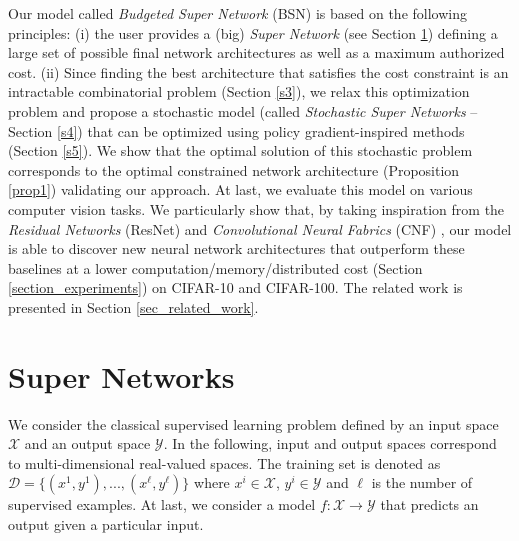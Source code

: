 \documentclass[10pt,twocolumn,letterpaper]{article}
\begin{document}
Our model called \textit{Budgeted Super Network} (BSN) is based on the following principles: (i) the user provides a (big) \textit{Super Network} (see Section \ref{secsn}) defining a large set of possible final network architectures as well as a maximum authorized cost. (ii) Since finding the best architecture that satisfies the cost constraint is an intractable combinatorial problem (Section \ref{s3}), we relax this optimization problem and propose a stochastic model (called \textit{Stochastic Super Networks} -- Section \ref{s4}) that can be optimized using policy gradient-inspired methods (Section \ref{s5}). We show that the optimal solution of this stochastic problem corresponds to the optimal constrained network architecture (Proposition \ref{prop1}) validating our approach. At last, we evaluate this model on various computer vision tasks. We particularly show that, by taking inspiration from the \textit{Residual Networks} (ResNet) \cite{DBLP:journals/corr/HeZRS15} and \textit{Convolutional Neural Fabrics} (CNF) \cite{DBLP:journals/corr/SaxenaV16}, our model is able to discover new neural network architectures that outperform these baselines at a lower computation/memory/distributed cost (Section \ref{section_experiments}) on CIFAR-10 and CIFAR-100. The related work is presented in Section \ref{sec_related_work}.






\section{Super Networks}
\label{secsn}
We consider the classical supervised learning problem defined by an input space $\mathcal{X}$ and an output space $\mathcal{Y}$. In the following, input and output spaces correspond to multi-dimensional real-valued spaces. The training set is denoted as $\mathcal{D}=\{ (x^1,y^1), ..., (x^\ell,y^\ell) \}$ where $x^i \in \mathcal{X}$, $y^i \in \mathcal{Y}$ and $\ell$ is the number of supervised examples.  At last, we consider a model $f:  \mathcal{X} \rightarrow \mathcal{Y}$ that predicts an output given a particular input. 
\end{document}
